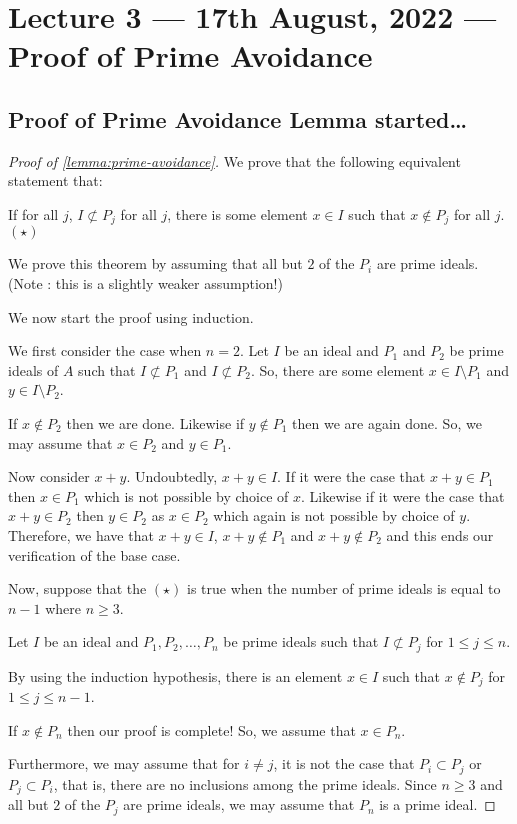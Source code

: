 \section{Lecture 3 --- 17th August, 2022 --- Proof of Prime Avoidance}
\subsection{Proof of Prime Avoidance Lemma started\dots}
\begin{proof}[Proof of \ref{lemma:prime-avoidance}]
    We prove that the following equivalent statement that:
    
    If for all $j$, $I\not\subset P_j$ for all $j$, there is some element $x\in I$ such that $x\not\in P_j$ for all $j$. $(\star)$


    We prove this theorem by assuming that all but $2$ of the $P_i$ are prime ideals. (Note : this is a slightly weaker assumption!)
    
     We now start the proof using induction.
    
    We first consider the case when $n=2$. Let $I$ be an ideal and $P_1$ and $P_2$ be prime ideals of $A$ such that $I \not \subset P_1$ and $I \not \subset P_2$. So, there are some element $x\in I \setminus P_1$ and $y\in I \setminus P_2$.

    If $x\not \in P_2$ then we are done. Likewise if $y\not \in P_1$ then we are again done. So, we may assume that $x\in P_2$ and $y\in P_1$.

    Now consider $x+y$. Undoubtedly, $x+y \in I$. If it were the case that $x+y \in P_1$ then $x\in P_1$ which is not possible by choice of $x$. Likewise if it were the case that $x+y \in P_2$ then $y \in P_2$ as $x\in P_2$ which again is not possible by choice of $y$. Therefore, we have that $x+y \in I$, $x+y \not \in P_1$ and $x+y \not \in P_2$ and this ends our verification of the base case.

    Now, suppose that the $(\star)$ is true when the number of prime ideals is equal to $n-1$ where $n\ge 3$. 

    Let $I$ be an ideal and $P_1 , P_2 , \ldots , P_n$ be prime ideals such that $I \not \subset P_j$ for $1\le j \le n$. 

    By using the induction hypothesis, there is an element $x\in I$ such that $x \not \in P_j$ for $1 \le j \le n-1$.


    If $x\not\in P_n$ then our proof is complete! So, we assume that $x\in P_n$.
    
    Furthermore, we may assume that for $i\ne j$, it is not the case that $P_i \subset P_j$ or $P_j \subset P_i$, that is, there are no inclusions among the prime ideals. Since $n\ge 3$ and all but $2$ of the $P_j$ are prime ideals, we may assume that $P_n$ is a prime ideal.
    

\end{proof}
